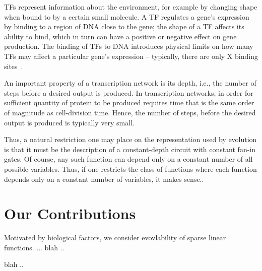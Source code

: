 TFs represent information about the environment,
for example by changing shape when bound to by a certain small molecule.
A TF regulates a gene's expression by binding to a region of DNA close to the
gene; the shape of a TF affects its ability to bind,
which in turn can have a positive or negative effect on gene production.
The binding of TFs to DNA introduces physical limits on how many TFs may affect
a particular gene's expression --
typically, there are only X binding sites~\cite{}.

An important property of a transcription network is its depth, i.e.,
the number of steps before a desired output is produced. In transcription
networks, in order for sufficient quantity of protein to be produced requires
time that is the same order of magnitude as cell-division time. Hence, the
number of steps, before the desired output is produced is typically very small.

Thus, a natural restriction one may place on the representation used by
evolution is that it must be the description of a constant-depth circuit with
constant fan-in gates. Of course, any such function can depend only on a
constant number of all possible variables. Thus, if one restricts the class of
functions where each function depends only on a constant number of variables, it
makes sense.. 


\section{Our Contributions}

Motivated by biological factors, we consider evovlability of sparse linear
functions. ... blah .. 

blah .. 

